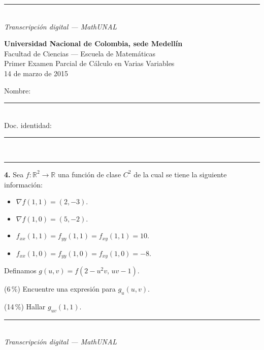 \documentclass[11pt]{article}
\newcommand{\examheader}{%
  \noindent
  \begin{minipage}[t]{0.62\linewidth}
    {\bfseries\large Universidad Nacional de Colombia, sede Medell\'in}\\
    {\small Facultad de Ciencias --- Escuela de Matem\'aticas}\\
    {\small Primer Examen Parcial de C\'alculo en Varias Variables}\\
    {\small 14 de marzo de 2015}
  \end{minipage}%
  \hfill
  \begin{minipage}[t]{0.33\linewidth}
    \raggedleft\small
    Nombre: \rule{3cm}{0.4pt}\\[4pt]
    Doc. identidad: \rule{2.5cm}{0.4pt}
  \end{minipage}\\[4pt]
  \rule{\linewidth}{0.6pt}
}
\newcommand{\examfooter}{%
  \vfill
  \rule{\linewidth}{0.4pt}\\[1pt]
  {\scriptsize\textit{Transcripci\'on digital --- MathUNAL}\hfill\textcolor{unalblue}{\textbf{\thepage}}}
}
\begin{document}
\vfill
\examfooter
\newpage
\examheader
\vspace{2pt}

\textbf{4.} Sea $f:\mathbb{R}^2\to\mathbb{R}$ una funci\'on de clase $C^2$ de la cual se tiene la siguiente informaci\'on:
\begin{itemize}[itemsep=1pt,topsep=2pt]
  \item $\nabla f(1,1)=(2,-3)$.
  \item $\nabla f(1,0)=(5,-2)$.
  \item $f_{xx}(1,1)=f_{yy}(1,1)=f_{xy}(1,1)=10$.
  \item $f_{xx}(1,0)=f_{yy}(1,0)=f_{xy}(1,0)=-8$.
\end{itemize}

Definamos $g(u,v)=f(2-u^2v,\,uv-1)$.

\begin{opciones}
  \item[a)] (6\,\%) Encuentre una expresi\'on para $g_u(u,v)$.
  \item[b)] (14\,\%) Hallar $g_{uv}(1,1)$.
\end{opciones}

\vfill
\examfooter
\end{document}
